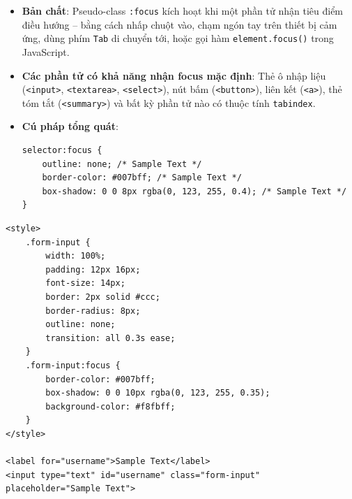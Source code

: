 \documentclass[11pt,oneside]{book}
\newcommand{\codeinline}[1]{\textcolor{accentOrange}{\texttt{#1}}}
\begin{document}
\begin{conceptBox}
\begin{itemize}[leftmargin=1.5em, itemsep=3pt, parsep=0pt]
    \item \textbf{Bản chất}: Pseudo-class \codeinline{:focus} kích hoạt khi một phần tử nhận tiêu điểm điều hướng -- bằng cách nhấp chuột vào, chạm ngón tay trên thiết bị cảm ứng, dùng phím \codeinline{Tab} di chuyển tới, hoặc gọi hàm \codeinline{element.focus()} trong JavaScript.
    \item \textbf{Các phần tử có khả năng nhận focus mặc định}: Thẻ ô nhập liệu (\codeinline{<input>}, \codeinline{<textarea>}, \codeinline{<select>}), nút bấm (\codeinline{<button>}), liên kết (\codeinline{<a>}), thẻ tóm tắt (\codeinline{<summary>}) và bất kỳ phần tử nào có thuộc tính \codeinline{tabindex}.
    \item \textbf{Cú pháp tổng quát}:
    \begin{codeWindow}
\begin{lstlisting}[language=CSS3]
selector:focus {
    outline: none; /* Sample Text */
    border-color: #007bff; /* Sample Text */
    box-shadow: 0 0 8px rgba(0, 123, 255, 0.4); /* Sample Text */
}
\end{lstlisting}
    \end{codeWindow}
\end{itemize}
\end{conceptBox}

\begin{conceptBox}
\begin{codeWindow}
\begin{lstlisting}[language=HTML5]
<style>
    .form-input {
        width: 100%;
        padding: 12px 16px;
        font-size: 14px;
        border: 2px solid #ccc;
        border-radius: 8px;
        outline: none;
        transition: all 0.3s ease;
    }
    .form-input:focus {
        border-color: #007bff;
        box-shadow: 0 0 10px rgba(0, 123, 255, 0.35);
        background-color: #f8fbff;
    }
</style>

<label for="username">Sample Text</label>
<input type="text" id="username" class="form-input" placeholder="Sample Text">
\end{lstlisting}
\end{codeWindow}
\end{conceptBox}
\end{document}

